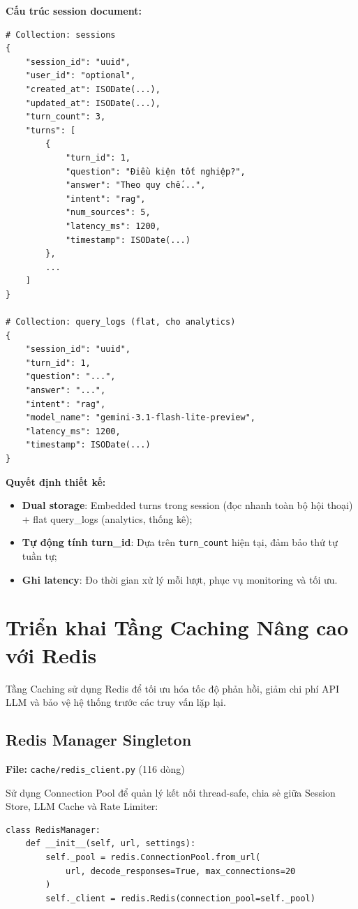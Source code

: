 \documentclass[../DoAn.tex]{subfiles}
\begin{document}
\textbf{Cấu trúc session document:}
\begin{verbatim}
# Collection: sessions
{
    "session_id": "uuid",
    "user_id": "optional",
    "created_at": ISODate(...),
    "updated_at": ISODate(...),
    "turn_count": 3,
    "turns": [
        {
            "turn_id": 1,
            "question": "Điều kiện tốt nghiệp?",
            "answer": "Theo quy chế...",
            "intent": "rag",
            "num_sources": 5,
            "latency_ms": 1200,
            "timestamp": ISODate(...)
        },
        ...
    ]
}

# Collection: query_logs (flat, cho analytics)
{
    "session_id": "uuid",
    "turn_id": 1,
    "question": "...",
    "answer": "...",
    "intent": "rag",
    "model_name": "gemini-3.1-flash-lite-preview",
    "latency_ms": 1200,
    "timestamp": ISODate(...)
}
\end{verbatim}

\textbf{Quyết định thiết kế:}
\begin{itemize}
    \item \textbf{Dual storage}: Embedded turns trong session (đọc nhanh toàn bộ hội thoại) + flat query\_logs (analytics, thống kê);
    \item \textbf{Tự động tính turn\_id}: Dựa trên \texttt{turn\_count} hiện tại, đảm bảo thứ tự tuần tự;
    \item \textbf{Ghi latency}: Đo thời gian xử lý mỗi lượt, phục vụ monitoring và tối ưu.
\end{itemize}


\section{Triển khai Tầng Caching Nâng cao với Redis}

Tầng Caching sử dụng Redis để tối ưu hóa tốc độ phản hồi, giảm chi phí API LLM và bảo vệ hệ thống trước các truy vấn lặp lại.

\subsection{Redis Manager Singleton}
\textbf{File:} \texttt{cache/redis\_client.py} (116 dòng)

Sử dụng Connection Pool để quản lý kết nối thread-safe, chia sẻ giữa Session Store, LLM Cache và Rate Limiter:
\begin{verbatim}
class RedisManager:
    def __init__(self, url, settings):
        self._pool = redis.ConnectionPool.from_url(
            url, decode_responses=True, max_connections=20
        )
        self._client = redis.Redis(connection_pool=self._pool)
\end{verbatim}
\end{document}
